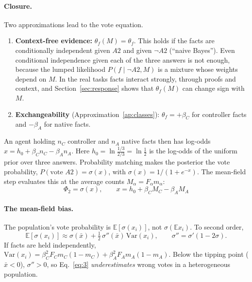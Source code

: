 \documentclass[10pt,a4paper]{article}
\theoremstyle{definition}
\newcommand{\E}{\mathbb E}
\begin{document}
\paragraph{Closure.} Two approximations lead to the vote equation.
\begin{enumerate}
\item \textbf{Context-free evidence:} $\theta_f(M)=\theta_f$. This holds if the facts are conditionally independent
  given $A2$ and given $\neg A2$ (``naive Bayes''). Even conditional independence given each of the three answers is not
  enough, because the lumped likelihood $P(f\mid\neg A2,M)$ is a mixture whose weights depend on $M$. In the real tasks
  facts interact strongly, through proofs and context, and Section~\ref{sec:response} shows that $\theta_f(M)$ can
  change sign with $M$.
\item \textbf{Exchangeability} (Approximation~\ref{ap:classes}): $\theta_f=+\beta_C$ for controller facts and
  $-\beta_A$ for native facts.
\end{enumerate}
An agent holding $n_C$ controller and $n_A$ native facts then has log-odds $x=h_0+\beta_C n_C-\beta_A n_A$. Here
$h_0=\ln\frac{1/3}{2/3}=\ln\frac12$ is the log-odds of the uniform prior over three answers. Probability matching makes
the posterior the vote probability, $P(\text{vote }A2)=\sigma(x)$, with $\sigma(x)=1/(1+e^{-x})$. The mean-field step
evaluates this at the average counts $M_\alpha=F_\alpha m_\alpha$:
\begin{equation}
\boxed{\ \Phi_2=\sigma(x),\qquad x=h_0+\beta_C M_C-\beta_A M_A\ }\label{eq:3}
\end{equation}

\paragraph{The mean-field bias.} The population's vote probability is $\E[\sigma(x_i)]$, not $\sigma(\E x_i)$. To
second order,
\begin{equation}
\E[\sigma(x_i)]\approx\sigma(\bar x)+\tfrac12\,\sigma''(\bar x)\,\mathrm{Var}(x_i),\qquad
\sigma''=\sigma'(1-2\sigma).
\end{equation}
If facts are held independently, $\mathrm{Var}(x_i)=\beta_C^2F_Cm_C(1-m_C)+\beta_A^2F_Am_A(1-m_A)$. Below the tipping
point ($\bar x<0$), $\sigma''>0$, so Eq.~\eqref{eq:3} \emph{underestimates} wrong votes in a heterogeneous population.
\end{document}

